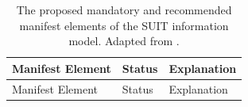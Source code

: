 \documentclass[0-thesis.tex]{subfiles}
\begin{document}
\begin{small}
\begin{longtable}[]{@{}lll@{}}
    \caption[The proposed mandatory and recommended manifest elements of the SUIT information model.]
        {The proposed mandatory and recommended manifest elements of the SUIT information model. Adapted from \parencite{suit-information-model}.}
    \label{tab:manifest-elements}\\
    \toprule
    \begin{minipage}[b]{0.23\columnwidth}\raggedright\strut
    Manifest Element\strut
    \end{minipage} & \begin{minipage}[b]{0.26\columnwidth}\raggedright\strut
    Status\strut
    \end{minipage} & \begin{minipage}[b]{0.42\columnwidth}\raggedright\strut
    Explanation\strut
    \end{minipage}\tabularnewline
    \midrule
    \endfirsthead
    \toprule
    \begin{minipage}[b]{0.23\columnwidth}\raggedright\strut
    Manifest Element\strut
    \end{minipage} & \begin{minipage}[b]{0.26\columnwidth}\raggedright\strut
    Status\strut
    \end{minipage} & \begin{minipage}[b]{0.42\columnwidth}\raggedright\strut
    Explanation\strut
    \end{minipage}\tabularnewline
    \midrule
    \endhead


\end{longtable}
\end{small}
\end{document}

